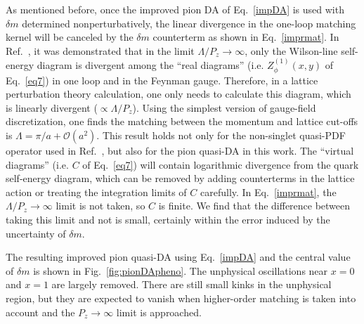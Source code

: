 As mentioned before, once the improved pion DA of Eq.~\ref{impDA} is used with $\delta m$ determined nonperturbatively, the linear divergence in the one-loop matching kernel will {be canceled} by the $\delta m$ counterterm as shown in Eq.~\ref{imprmat}.
In Ref.~\cite{Chen:2016fxx}, it was demonstrated that in the limit $\Lambda/P_z \to \infty$, only the Wilson-line self-energy diagram is divergent among the ``real diagrams'' (i.e. $Z_\phi^{(1)}(x, y)$ of Eq.~\ref{eq7}) 
in one loop and in the Feynman gauge. Therefore, in a lattice perturbation theory calculation, one only needs to calculate this diagram, which is linearly divergent ($\propto \Lambda/P_z$). Using the simplest version of gauge-field discretization, one finds the matching between the momentum and lattice cut-offs is $\Lambda =\pi/a +\mathcal{O}(a^2)$. This result holds not only for the non-singlet quasi-PDF operator used in Ref.~\cite{Chen:2016fxx}, but also for the pion quasi-DA in this work. The ``virtual diagrams'' (i.e. $C$ of Eq.~\ref{eq7}) will contain logarithmic divergence from the quark self-energy diagram, which can be removed by adding counterterms in the lattice action or treating the integration limits of $C$ carefully. In Eq.~\ref{imprmat}, the $\Lambda/P_z \to \infty$ limit is not taken, so $C$ is finite. We find that the difference between taking this limit and not is small, certainly within the error induced by the uncertainty of $\delta m$.


The resulting improved pion quasi-DA using Eq.~\ref{impDA} 
and the central value of $\delta m$ is shown in Fig.~\ref{fig:pionDApheno}. The unphysical oscillations near $x=0$ and $x=1$ are largely removed. There are still small kinks in the unphysical region, but they are expected to vanish when higher-order matching is taken into account and the $P_z \to \infty$ limit is approached. 

